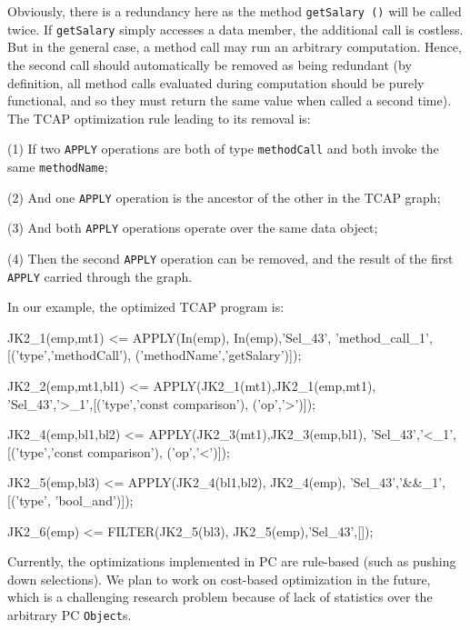 Obviously, there is a redundancy here as the method \texttt{getSalary ()} will be called twice.
If \texttt{getSalary} simply accesses a data member, the additional
call is costless.  But in the general case, a method call may run an arbitrary
computation.  Hence, the second call should automatically be removed as being redundant 
(by definition, all method calls evaluated during computation should
be purely functional, and so they must return the same value when called a second time).
The TCAP optimization rule leading to its removal is:

\vspace{5pt}

\noindent
(1) If two \texttt{APPLY} operations are both of type \texttt{methodCall} and both invoke the same \texttt{methodName};

\noindent
(2) And one \texttt{APPLY} operation is the ancestor of the other in the TCAP graph;

\noindent
(3) And both \texttt{APPLY} operations operate over the same data object;

\noindent
(4) Then the second \texttt{APPLY} operation can be removed, and the
result of the first \texttt{APPLY} carried through the graph.

\vspace{5pt}

\noindent
In our example, the
optimized
TCAP program is:

\begin{codesmall}
JK2_1(emp,mt1) <= APPLY(In(emp), In(emp),'Sel_43', 
  'method_call_1',[('type','methodCall'),
  ('methodName','getSalary')]);

JK2_2(emp,mt1,bl1) <= APPLY(JK2_1(mt1),JK2_1(emp,mt1), 
  'Sel_43','>_1',[('type','const comparison'),
  ('op','>')]);

JK2_4(emp,bl1,bl2) <= APPLY(JK2_3(mt1),JK2_3(emp,bl1),
  'Sel_43','<_1',[('type','const comparison'),
  ('op','<')]);

JK2_5(emp,bl3) <= APPLY(JK2_4(bl1,bl2), JK2_4(emp), 
  'Sel_43','&&_1',[('type', 'bool_and')]);

JK2_6(emp) <= FILTER(JK2_5(bl3), JK2_5(emp),'Sel_43',[]);
  
\end{codesmall}

\noindent
Currently, the optimizations implemented in PC are rule-based (such as pushing down selections).  We plan to work on cost-based optimization
in the future, which is a challenging research problem because of lack of statistics over the arbitrary PC \texttt{Object}s.
